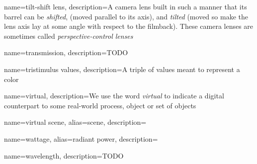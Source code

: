 {
	name={tilt-shift lens},
	description={A camera lens built in such a manner that its barrel can be \emph{shifted},
		(moved parallel to its axis), and \emph{tilted} (moved so make the lens axis 
		lay at some angle with respect to the filmback). These camera lenses are sometimes called
		\emph{perspective-control lenses}}
}

{
	name={transmission},
	description={TODO}
}

{
	name={tristimulus values},
	description={A triple of values meant to represent a color}
}
	
{    
	name={virtual},
	description={We use the word \textsl{virtual} to indicate a digital counterpart to some
		real-world process, object or set of objects}
}

{
	name={virtual scene},
	alias={scene},
	description=\nopostdesc
}

{    
	name={wattage},
	alias={radiant power},
	description=\nopostdesc
}

{    
	name={wavelength},
	description={TODO}
}

